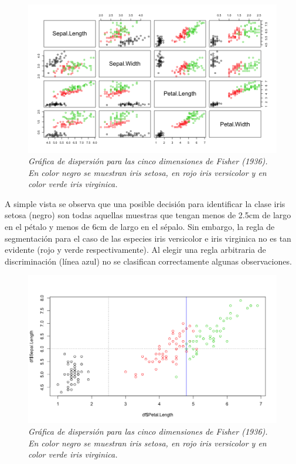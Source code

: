 \documentclass[letterpaper,12pt, spanish, oneside]{book} %
\begin{document}
\begin{figure}[H]
\centering
\includegraphics[width=1\textwidth]{iris3.png}
\caption{\label{fig:frog2}\textit{Gráfica de dispersión para las cinco dimensiones de Fisher (1936). En color negro se muestran iris setosa, en rojo iris versicolor y en color verde iris virginica. }}
\end{figure}

A simple vista se observa que una posible decisión para identificar la clase iris setosa (negro) son todas aquellas muestras que tengan menos de 2.5cm de largo en el pétalo y menos de 6cm de largo en el sépalo. Sin embargo, la regla de segmentación para el caso de las especies iris versicolor e iris virginica no es tan evidente (rojo y verde respectivamente). Al elegir una regla arbitraria de discriminación (línea azul) no se clasifican correctamente algunas observaciones.

\begin{figure}[H]
\centering
\includegraphics[width=1\textwidth]{iris4.png}
\caption{\label{fig:frog2}\textit{Gráfica de dispersión para las cinco dimensiones de Fisher (1936). En color negro se muestran iris setosa, en rojo iris versicolor y en color verde iris virginica. }}
\end{figure}
\end{document}
